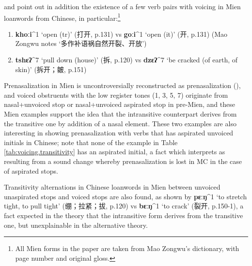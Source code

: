 \documentclass[oneside,a4paper,11pt]{article}
\newcommand{\ipa}[1]{\textbf{{\phon\mbox{#1}}}} %
\newcommand{\zh}[1]{{\cn #1}}
\newcommand{\mien}[5]{\ipa{#1}^{#2} `#3' (\zh{#4}, p.#5)}
\begin{document}
 \citet{downer73loanwords} and \citet{sagart03prenasalized} point out in addition the existence of 
a few verb pairs with voicing in Mien loanwords from Chinese, in particular:\footnote{All Mien forms in the paper are taken from Mao Zongwu's \citeyear{maozw92mien} dictionary, with page number and original gloss.} 

\begin{enumerate}
\item \mien{khoːi}{1}{open (tr)}{打开}{131}  vs \mien{goːi}{1}{open (it)}{开}{131}  (Mao Zongwu notes `\zh{多作补语祸自然开裂、开放}')
\item \mien{tshɛʔ}{7}{pull down (house)}{拆}{120} vs \mien{dzɛʔ}{7}{be cracked (of earth, of skin)}{拆开；皴}{151}
\end{enumerate}

Prenasalization in Mien is uncontroversially reconstructed as prenasalization (\citealt{ratliff10protohm}), and voiced obstruents with the low register tones (1, 3, 5, 7) originate from nasal+unvoiced stop or nasal+unvoiced aspirated stop in pre-Mien, and these Mien examples support the idea that the intransitive counterpart derives from the transitive one by addition of a nasal element. These two examples are also interesting in showing prenasalization with verbs that has aspirated unvoiced initials in Chinese; note that none of the example in Table \ref{tab:voicing.transitivity} has an aspirated initial, a fact which \citet{sagart03prenasalized} interprets as resulting from a sound change whereby prenasalization is lost in MC in the case of aspirated stops.

Transitivity alternations in Chinese loanwords in Mien between unvoiced unaspirated stops and voiced stops are also found, as shown by \mien{pɛːŋ}{1}{to stretch tight, to pull tight}{绷；拉紧；拔}{120} vs \mien{bɛːŋ}{1}{to crack}{裂开}{150-1}, a fact expected in the theory that the intransitive form derives from the transitive one, but unexplainable in the alternative theory.
\end{document}

